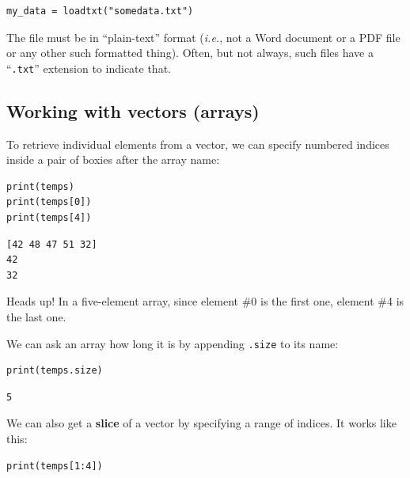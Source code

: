 \begin{Verbatim}[fontsize=\small,samepage=true,frame=single,framesep=3mm]
my_data = loadtxt("somedata.txt")
\end{Verbatim}


The file must be in ``plain-text'' format (\textit{i.e.}, not a Word document
or a PDF file or any other such formatted thing). Often, but not always, such
files have a ``\texttt{.txt}'' extension to indicate that.


\subsection*{Working with vectors (arrays)}

To retrieve individual elements from a vector, we can specify numbered indices
inside a pair of boxies after the array name:

\begin{Verbatim}[fontsize=\small,samepage=true,frame=single,framesep=3mm]
print(temps)
print(temps[0])
print(temps[4])
\end{Verbatim}

\vspace{-.2in}
\begin{Verbatim}[fontsize=\small,samepage=true,frame=leftline,framesep=5mm,framerule=1mm]
[42 48 47 51 32]
42
32
\end{Verbatim}

Heads up! In a five-element array, since element \#0 is the first one, element
\#4 is the last one.

We can ask an array how long it is by appending \texttt{.size} to its name:

\begin{Verbatim}[fontsize=\small,samepage=true,frame=single,framesep=3mm]
print(temps.size)
\end{Verbatim}
\vspace{-.2in}

\begin{Verbatim}[fontsize=\small,samepage=true,frame=leftline,framesep=5mm,framerule=1mm]
5
\end{Verbatim}

\label{slice}

We can also get a \textbf{slice} of a vector by specifying a range of indices.
It works like this:

\begin{Verbatim}[fontsize=\small,samepage=true,frame=single,framesep=3mm]
print(temps[1:4])
\end{Verbatim}
\vspace{-.2in}

